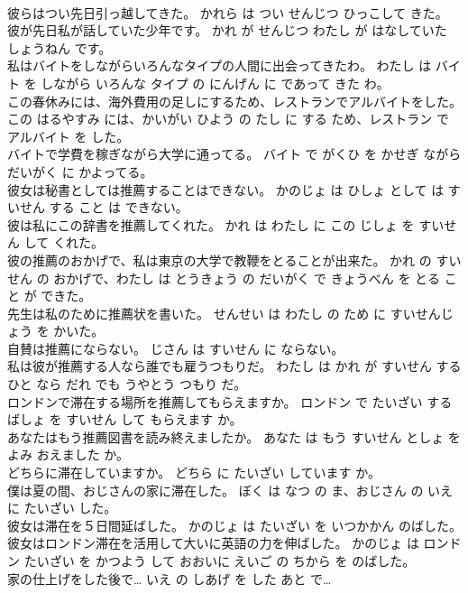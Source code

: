 \documentclass[8pt]{extreport}
\begin{document}
\begin{CJK}{UTF8}{min}
\\	彼らはつい先日引っ越してきた。	かれら は つい せんじつ ひっこして きた。	
\\	彼が先日私が話していた少年です。	かれ が せんじつ わたし が はなしていた しょうねん です。	
\\	私はバイトをしながらいろんなタイプの人間に出会ってきたわ。	わたし は バイト を しながら いろんな タイプ の にんげん に であって きた わ。	
\\	この春休みには、海外費用の足しにするため、レストランでアルバイトをした。	この はるやすみ には、かいがい ひよう の たし に する ため、レストラン で アルバイト を した。	
\\	バイトで学費を稼ぎながら大学に通ってる。	バイト で がくひ を かせぎ ながら だいがく に かよってる。	
\\	彼女は秘書としては推薦することはできない。	かのじょ は ひしょ として は すいせん する こと は できない。	
\\	彼は私にこの辞書を推薦してくれた。	かれ は わたし に この じしょ を すいせん して くれた。	
\\	彼の推薦のおかげで、私は東京の大学で教鞭をとることが出来た。	かれ の すいせん の おかげで、わたし は とうきょう の だいがく で きょうべん を とる こと が できた。	
\\	先生は私のために推薦状を書いた。	せんせい は わたし の ため に すいせんじょう を かいた。	
\\	自賛は推薦にならない。	じさん は すいせん に ならない。	
\\	私は彼が推薦する人なら誰でも雇うつもりだ。	わたし は かれ が すいせん する ひと なら だれ でも うやとう つもり だ。	
\\	ロンドンで滞在する場所を推薦してもらえますか。	ロンドン で たいざい する ばしょ を すいせん して もらえます か。	
\\	あなたはもう推薦図書を読み終えましたか。	あなた は もう すいせん としょ を よみ おえました か。	
\\	どちらに滞在していますか。	どちら に たいざい しています か。	
\\	僕は夏の間、おじさんの家に滞在した。	ぼく は なつ の ま、おじさん の いえ に たいざい した。	
\\	彼女は滞在を５日間延ばした。	かのじょ は たいざい を いつかかん のばした。	
\\	彼女はロンドン滞在を活用して大いに英語の力を伸ばした。	かのじょ は ロンドン たいざい を かつよう して おおいに えいご の ちから を のばした。	
\\	家の仕上げをした後で…	いえ の しあげ を した あと で…	

\end{CJK}
\end{document}
